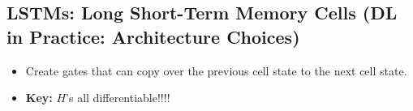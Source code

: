 \subsection{LSTMs: Long Short-Term Memory Cells (DL in Practice: Architecture Choices)}
\begin{summary}
    \begin{itemize}
        \item Create gates that can copy over the previous cell state to the next cell state. 
        \item \textbf{Key:} $H$'s all differentiable!!!!
    \end{itemize}

\end{summary}

